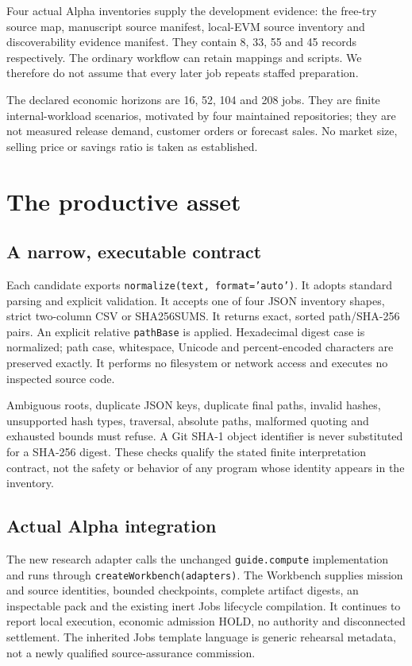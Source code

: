 \documentclass[11pt,a4paper]{article}
\newcommand{\code}[1]{\texttt{#1}}
\begin{document}
Four actual Alpha inventories supply the development evidence: the free-try source
map, manuscript source manifest, local-EVM source inventory and discoverability
evidence manifest. They contain 8, 33, 55 and 45 records respectively. The ordinary
workflow can retain mappings and scripts. We therefore do not assume that every
later job repeats staffed preparation.

The declared economic horizons are 16, 52, 104 and 208 jobs. They are finite
internal-workload scenarios, motivated by four maintained repositories; they are
not measured release demand, customer orders or forecast sales. No market size,
selling price or savings ratio is taken as established.

\section{The productive asset}
\subsection{A narrow, executable contract}
Each candidate exports \code{normalize(text, format='auto')}. It adopts standard
parsing and explicit validation. It accepts one of four JSON inventory shapes,
strict two-column CSV or SHA256SUMS. It returns exact, sorted path/SHA-256 pairs.
An explicit relative \code{pathBase} is applied. Hexadecimal digest case is
normalized; path case, whitespace, Unicode and percent-encoded characters are
preserved exactly. It performs no filesystem or network access and executes no
inspected source code.

Ambiguous roots, duplicate JSON keys, duplicate final paths, invalid hashes,
unsupported hash types, traversal, absolute paths, malformed quoting and exhausted
bounds must refuse. A Git SHA-1 object identifier is never substituted for a
SHA-256 digest. These checks qualify the stated finite interpretation contract,
not the safety or behavior of any program whose identity appears in the inventory.

\subsection{Actual Alpha integration}
The new research adapter calls the unchanged \code{guide.compute} implementation
and runs through \code{createWorkbench(adapters)}. The Workbench supplies mission
and source identities, bounded checkpoints, complete artifact digests, an
inspectable pack and the existing inert Jobs lifecycle compilation. It continues
to report local execution, economic admission HOLD, no authority and disconnected
settlement. The inherited Jobs template language is generic rehearsal metadata,
not a newly qualified source-assurance commission.
\end{document}
